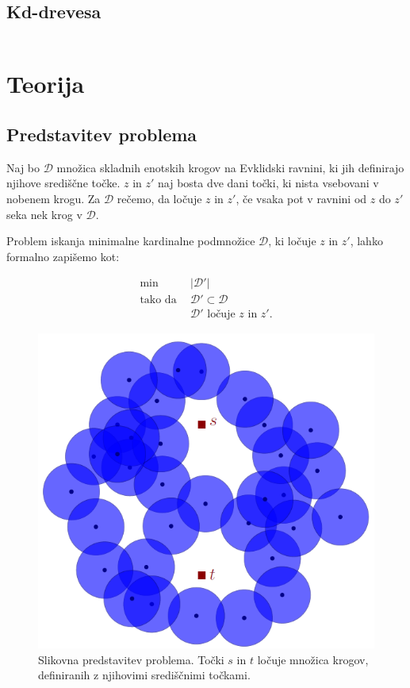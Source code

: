 \documentclass[a4paper, 12pt]{book}
\newcommand{\D}{\ensuremath{\mathcal{D}}}
\begin{document}
\section{Kd-drevesa}\begin{equation}
\end{equation}


\chapter{Teorija}
\section{Predstavitev problema}
Naj bo $\D$ množica skladnih enotskih krogov na Evklidski ravnini, ki jih definirajo njihove središčne točke.  $z$ in $z'$ naj bosta dve dani točki, ki nista vsebovani v nobenem krogu. Za $\D$ rečemo, da ločuje $z$ in $z'$, če vsaka pot v ravnini od $z$ do $z'$ seka nek krog v $\D$.

Problem iskanja minimalne kardinalne podmnožice $\D$, ki ločuje $z$ in $z'$, lahko formalno zapišemo kot:

\begin{align*}
	\min ~~		& |\D'|\\
	 \mbox{tako da}~~ & \D'\subset \D\\
				&	\D'\text{ ločuje $z$ in $z'$}. 
\end{align*}

\begin{figure}
\centerline{\includegraphics[scale=0.5]{pics/separation.png}}
\caption{Slikovna predstavitev problema. Točki $s$ in $t$ ločuje množica krogov, definiranih z njihovimi središčnimi točkami.}
\label{separation}
\end{figure}
\end{document}
